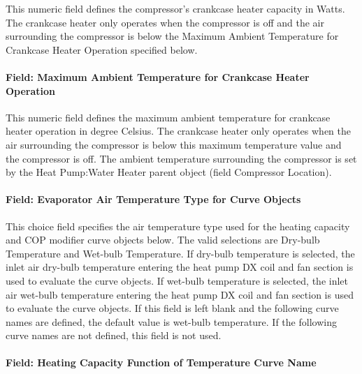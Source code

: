 This numeric field defines the compressor's crankcase heater capacity in Watts. The crankcase heater only operates when the compressor is off and the air surrounding the compressor is below the Maximum Ambient Temperature for Crankcase Heater Operation specified below.

\paragraph{Field: Maximum Ambient Temperature for Crankcase Heater Operation}\label{field-maximum-ambient-temperature-for-crankcase-heater-operation-1}

This numeric field defines the maximum ambient temperature for crankcase heater operation in degree Celsius. The crankcase heater only operates when the air surrounding the compressor is below this maximum temperature value and the compressor is off. The ambient temperature surrounding the compressor is set by the Heat Pump:Water Heater parent object (field Compressor Location).

\paragraph{Field: Evaporator Air Temperature Type for Curve Objects}\label{field-evaporator-air-temperature-type-for-curve-objects-1}

This choice field specifies the air temperature type used for the heating capacity and COP modifier curve objects below. The valid selections are Dry-bulb Temperature and Wet-bulb Temperature. If dry-bulb temperature is selected, the inlet air dry-bulb temperature entering the heat pump DX coil and fan section is used to evaluate the curve objects. If wet-bulb temperature is selected, the inlet air wet-bulb temperature entering the heat pump DX coil and fan section is used to evaluate the curve objects. If this field is left blank and the following curve names are defined, the default value is wet-bulb temperature. If the following curve names are not defined, this field is not used.

\paragraph{Field: Heating Capacity Function of Temperature Curve Name}\label{field-heating-capacity-function-of-temperature-curve-name-2}

